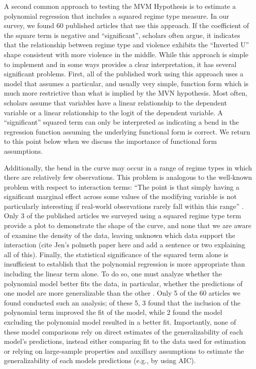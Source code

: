 \documentclass[titlepage, onecolumn,12pt]{article}
\begin{document}
A second common approach to testing the MVM Hypothesis is to estimate a polynomial regression that includes a squared regime type measure. In our survey, we found 60 published articles that use this approach.  If the coefficient of the square term is negative and ``significant'', scholars often argue, it indicates that the relationship between regime type and violence exhibits the ``Inverted U'' shape consistent with more violence in the middle.  While this approach is simple to implement and in some ways provides a clear interpretation, it has several significant problems. First, all of the published work using this approach uses a model that assumes a particular, and usually very simple, function form which is much more restrictive than what is implied by the MVN hypothesis. Most often, scholars assume that variables have a linear relationship to the dependent variable or a linear relationship to the logit of the dependent variable. A ``significant'' squared term can only be interpreted as indicating a bend in the regression function assuming the underlying functional form is correct. We return to this point below when we discuss the importance of functional form assumptions.

Additionally, the bend in the curve may occur in a range of regime types in which there are relatively few observations.  This problem is analogous to the well-known problem with respect to interaction terms: ``The point is that simply having a significant marginal effect across some values of the modifying variable is not particularly interesting if real-world observations rarely fall within this range'' \citep[][p.14]{brambor2006understanding}. Only 3 of the published articles we surveyed using a squared regime type term provide a plot to demonstrate the shape of the curve, and none that we are aware of examine the density of the data, leaving unknown which data support the interaction \citep{king2006dangers} (cite Jen's polmeth paper here and add a sentence or two explaining all of this). Finally, the statistical significance of the squared term alone is insufficient to establish that the polynomial regression is more appropriate than including the linear term alone. To do so, one must analyze whether the polynomial model better fits the data, in particular, whether the predictions of one model are more generalizable than the other \citep{fariss2014reproduction}. Only 5 of the 60 articles we found conducted such an analysis; of these 5, 3 found that the inclusion of the polynomial term improved the fit of the model, while 2 found the model excluding the polynomial model resulted in a better fit. Importantly, none of these model comparisons rely on direct estimates of the generalizability of each model's predictions, instead either comparing fit to the data used for estimation or relying on large-sample properties and auxillary assumptions to estimate the generalizability of each models predictions (e.g., by using AIC).
\end{document}
